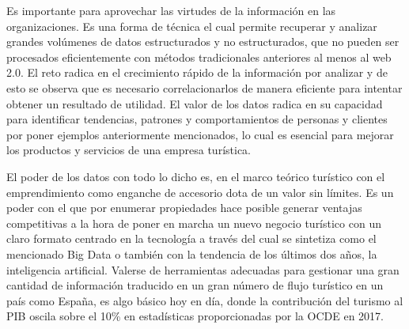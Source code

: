 \documentclass[
  letterpaper,
  DIV=11,
  numbers=noendperiod]{scrreprt}
\begin{document}
Es importante para aprovechar las virtudes de la información en las
organizaciones. Es una forma de técnica el cual permite recuperar y
analizar grandes volúmenes de datos estructurados y no estructurados,
que no pueden ser procesados eficientemente con métodos tradicionales
anteriores al menos al web 2.0. El reto radica en el crecimiento rápido
de la información por analizar y de esto se observa que es necesario
correlacionarlos de manera eficiente para intentar obtener un resultado
de utilidad. El valor de los datos radica en su capacidad para
identificar tendencias, patrones y comportamientos de personas y
clientes por poner ejemplos anteriormente mencionados, lo cual es
esencial para mejorar los productos y servicios de una empresa
turística.

El poder de los datos con todo lo dicho es, en el marco teórico
turístico con el emprendimiento como enganche de accesorio dota de un
valor sin límites. Es un poder con el que por enumerar propiedades hace
posible generar ventajas competitivas a la hora de poner en marcha un
nuevo negocio turístico con un claro formato centrado en la tecnología a
través del cual se sintetiza como el mencionado Big Data o también con
la tendencia de los últimos dos años, la inteligencia artificial.
Valerse de herramientas adecuadas para gestionar una gran cantidad de
información traducido en un gran número de flujo turístico en un país
como España, es algo básico hoy en día, donde la contribución del
turismo al PIB oscila sobre el 10\% en estadísticas proporcionadas por
la OCDE en 2017.
\end{document}

